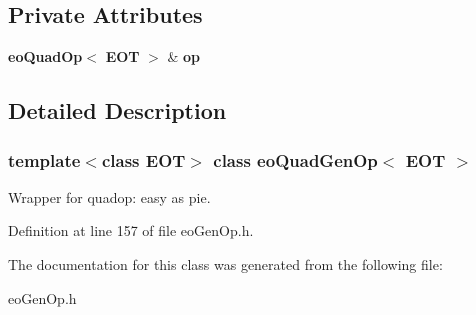\subsection*{Private Attributes}
\begin{CompactItemize}
\item 
{\bf eo\-Quad\-Op}$<$ {\bf EOT} $>$ \& {\bf op}\label{classeo_quad_gen_op_r0}

\end{CompactItemize}


\subsection{Detailed Description}
\subsubsection*{template$<$class EOT$>$ class eo\-Quad\-Gen\-Op$<$ EOT $>$}

Wrapper for quadop: easy as pie. 



Definition at line 157 of file eo\-Gen\-Op.h.

The documentation for this class was generated from the following file:\begin{CompactItemize}
\item 
eo\-Gen\-Op.h\end{CompactItemize}
